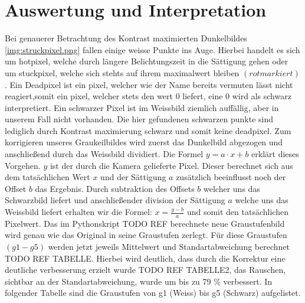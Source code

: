 \section{Auswertung und Interpretation}
Bei genauerer Betrachtung des Kontrast maximierten Dunkelbildes \ref{img:struckpixel.png} fallen einige weisse Punkte ins Auge. Hierbei handelt es sich um hotpixel, welche durch längere Belichtungszeit in die Sättigung gehen oder um stuckpixel, welche sich stehts auf ihrem maximalwert bleiben $(rot markiert)$.
Ein Deadpixel ist ein pixel, welcher wie der Name bereits vermuten lässt nicht reagiert,somit ein pixel, welcher stets den wert 0 liefert, eine 0 wird als schwarz interpretiert. Ein schwarzer Pixel ist im Weissbild ziemlich auffällig, aber in unserem Fall nicht vorhanden. Die hier gefundenen schwarzen punkte sind lediglich durch Kontrast maximierung schwarz und somit keine deadpixel.
Zum korrigieren unseres Graukeilbildes wird zuerst das Dunkelbild abgezogen und anschließend durch das Weissbild dividiert. Die Formel $y = a\cdot x+b$ erklärt dieses Vorgehen. $y$ ist der durch die Kamera gelieferte Pixel. Dieser berechnet sich aus dem tatsächlichen Wert $x$ und der Sättigung $a$ zusätzlich beeinflusst noch der Offset $b$ das Ergebnis. Durch subtraktion des Offsets $b$ welcher uns das Schwarzbild liefert und anschließender division der Sättigung $a$ welche uns das Weissbild liefert erhalten wir die Formel: $x = \frac{y-b}{a}$ und somit den tatsächlichen Pixelwert.
Das im Pythonskript TODO REF berechnete neue Graustufenbild wird genau wie das Original in seine Graustufen zerlegt. Für diese Graustufen $(g1 - g5)$ werden jetzt jeweils Mittelwert und Standartabweichung berechnet TODO REF TABELLE. Hierbei wird deutlich, dass durch die Korrektur eine deutliche verbesserung erzielt wurde TODO REF TABELLE2, das Rauschen, sichtbar an der Standartabweichung, wurde um bis zu 79 \% verbessert.
In folgender Tabelle sind die Graustufen von g1 (Weiss) bis g5 (Schwarz) aufgelistet.

